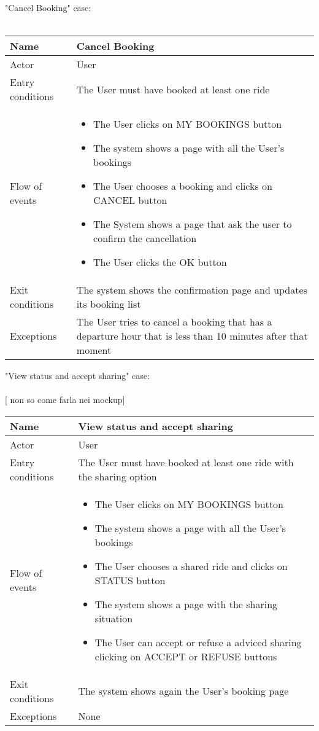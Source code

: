 \newpage
"Cancel Booking" case:
\\
\\
\begin{tabular}{|p{3cm}|p{10cm}|}
\hline
Name & Cancel Booking\\
\hline
Actor & User\\
\hline
Entry conditions & The User must have booked at least one ride\\
\hline
Flow of events &
	\begin{itemize}
		\item The User clicks on MY BOOKINGS button
		\item The system shows a page with all the User's bookings
		\item The User chooses a booking and clicks on CANCEL button
		\item The System shows a page that ask the user to confirm the cancellation \askpippo
		\item The User clicks the OK button
	\end{itemize}\\
\hline
Exit conditions & The system shows the confirmation page and updates its booking list\\
\hline
Exceptions & The User tries to cancel a booking that has a departure hour that is less than 10 minutes after that moment\\
\hline
\end {tabular}

\newpage
"View status and accept sharing" case:
\\
\\
$[$ non so come farla nei mockup$]$\askpippo\\
\begin{tabular}{|p{3cm}|p{10cm}|}
\hline
Name & View status and accept sharing\\
\hline
Actor & User\\
\hline
Entry conditions & The User must have booked at least one ride with the sharing option\\
\hline
Flow of events &
	\begin{itemize}
			\item The User clicks on MY BOOKINGS button
			\item The system shows a page with all the User's bookings
			\item The User chooses a shared ride and clicks on STATUS button
			\item The system shows a page with the sharing situation
			\item The User can accept or refuse a adviced sharing clicking on ACCEPT or REFUSE buttons
	\end{itemize}\\
\hline
Exit conditions & The system shows again the User's booking page\\
\hline
Exceptions & None\\
\hline
\end {tabular}

